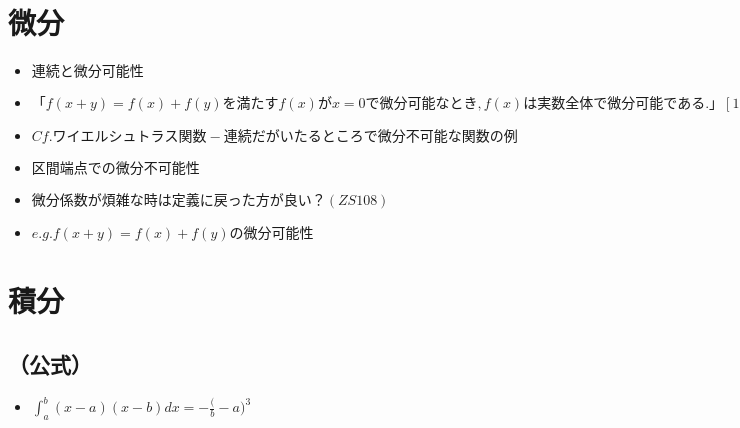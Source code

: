 \documentclass[dvipdfmx,uplatex]{jsarticle}
\begin{document}
\section{微分}
\begin{itemize}
	\item $ 連続と微分可能性$
		\item $ 「f(x + y) = f(x) + f(y)を満たす f(x) が x = 0 で微分可能なとき, f(x) は実数全体で微分可能である.」[12]例II$
		\item $ Cf. ワイエルシュトラス関数 - 連続だがいたるところで微分不可能な関数の例$
	\item $ 区間端点での微分不可能性$
	\item $ 微分係数が煩雑な時は定義に戻った方が良い？(ZS108)$
		\item $ e.g. f(x+y) = f(x) + f(y) の微分可能性$
\end{itemize}

\section{積分}
\subsection{（公式）}
\begin{itemize}
	\item $ \int^b_a (x - a)(x - b)dx = - \frac (b - a)^3$
\end{itemize}
\end{document}
